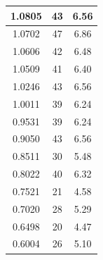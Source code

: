\begin{table}
\begin{tabular}{|c|c|c|}
1.0805	&	43	&	6.56	\\ \hline
1.0702	&	47	&	6.86	\\ \hline
1.0606	&	42	&	6.48	\\ \hline
1.0509	&	41	&	6.40	\\ \hline
1.0246	&	43	&	6.56	\\ \hline
1.0011	&	39	&	6.24	\\ \hline
0.9531	&	39	&	6.24	\\ \hline
0.9050	&	43	&	6.56	\\ \hline
0.8511	&	30	&	5.48	\\ \hline
0.8022	&	40	&	6.32	\\ \hline
0.7521	&	21	&	4.58	\\ \hline
0.7020	&	28	&	5.29	\\ \hline
0.6498	&	20	&	4.47	\\ \hline
0.6004	&	26	&	5.10	\\ \hline

\end{tabular}
\end{table}




  
